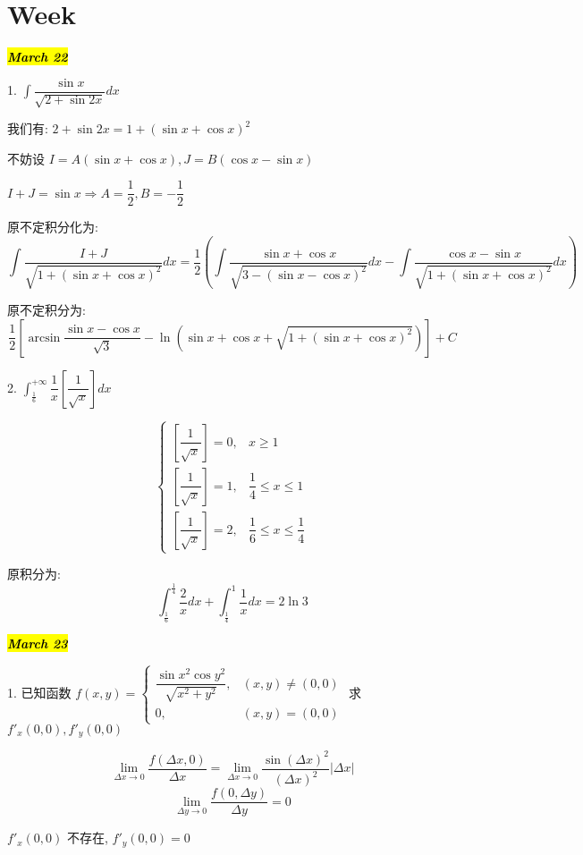 \section{Week }

\hl{\textbf{\textit{March 22}}}

1. $\int\dfrac{\sin x}{\sqrt{2+\sin 2x}}dx$\label{problem: 组合积分法}
\begin{solution}
	
	我们有: $2+\sin 2x=1+(\sin x+\cos x)^2$
	
	不妨设 $I=A(\sin x+\cos x),J=B(\cos x-\sin x)$ 
	
	$ I+J=\sin x\Rightarrow A=\dfrac{1}{2},B=-\dfrac{1}{2}$
	
	原不定积分化为: 
	$$\int\frac{I+J}{\sqrt{1+(\sin x+\cos x)^2}}dx=\frac{1}{2}\left( \int\frac{\sin x+\cos x}{\sqrt{3-(\sin x-\cos x)^2}}dx-\int\frac{\cos x-\sin x}{\sqrt{1+(\sin x+\cos x)^2}}dx\right)$$
	
	原不定积分为: 
	$$\dfrac{1}{2}\left[ \arcsin \frac{\sin x-\cos x}{\sqrt{3}}-\ln(\sin x+\cos x+\sqrt{1+(\sin x+\cos x)^2} )\right] +C$$
\end{solution}

2. $\int_{\frac{1}{6}}^{+\infty}\dfrac{1}{x}\left[ \dfrac{1}{\sqrt{x}}\right]dx$
\begin{solution}
	
	$$\begin{cases}
		\left[ \dfrac{1}{\sqrt{x}}\right]=0, &x\geq 1\\
		\left[ \dfrac{1}{\sqrt{x}}\right]=1, &\dfrac{1}{4}\leq x\leq 1\\
		\left[ \dfrac{1}{\sqrt{x}}\right]=2, &\dfrac{1}{6}\leq x\leq \dfrac{1}{4}
	\end{cases}$$
	
	原积分为: 
	$$\int_{\frac{1}{6}}^{\frac{1}{4}}\dfrac{2}{x}dx+\int_{\frac{1}{4}}^{1}\dfrac{1}{x}dx=2\ln 3$$
\end{solution}

\hl{\textbf{\textit{March 23}}}

1. 已知函数 $f(x,y)=
\begin{cases}
	\dfrac{\sin x^2\cos y^2}{\sqrt{x^2+y^2}}, &(x,y)\neq (0,0)\\
	0, &(x,y)=(0,0)
\end{cases}$ 求 $f'_{x}(0,0),f'_{y}(0,0)$
\begin{solution}
	
	$$\lim\limits_{\Delta x\rightarrow 0}\frac{f(\Delta x,0)}{\Delta x}=\lim\limits_{\Delta x\rightarrow 0}\frac{\sin (\Delta x)^2}{(\Delta x)^2}|\Delta x|$$
	$$\lim\limits_{\Delta y\rightarrow 0}\frac{f(0,\Delta y)}{\Delta y}=0$$
	
	$f'_{x}(0,0)$ 不存在, $f'_{y}(0,0)=0$
\end{solution}


